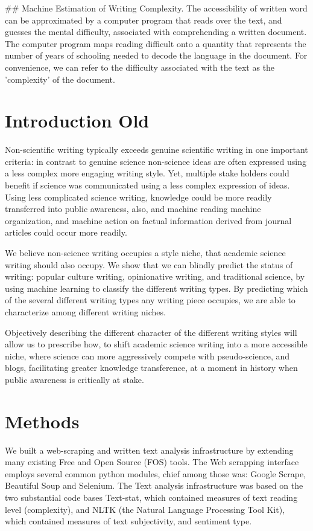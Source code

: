 \documentclass{clv3}
\begin{document}
## Machine Estimation of Writing Complexity.
The accessibility of written word can be approximated by a computer program that reads over the text, and guesses the mental difficulty, associated with comprehending a written document. The computer program maps reading difficult onto a quantity that represents the number of years of schooling needed to decode the language in the document. For convenience, we can refer to the difficulty associated with the text as the 'complexity' of the document. 


\section{Introduction Old}

Non-scientific writing typically exceeds genuine scientific writing in one important criteria: in contrast to genuine science non-science ideas are often expressed using a less complex more engaging writing style.  Yet, multiple stake holders could benefit if science was communicated using a less complex expression of ideas. Using less complicated science writing, knowledge could be more readily transferred into public awareness, also, and machine reading machine organization, and machine action on factual information derived from journal articles could occur more readily.

We believe non-science writing occupies a style niche, that academic science writing should also occupy. We show that we can blindly predict the status of writing: popular culture writing, opinionative writing, and traditional science, by using machine learning to classify the different writing types. By predicting which of the several different writing types any writing piece occupies, we are able to characterize among different writing niches.

Objectively describing the different character of the different writing styles will allow us to prescribe how, to shift academic science writing into a more accessible niche, where science can more aggressively compete with pseudo-science, and blogs, facilitating greater knowledge transference, at a moment in history when public awareness is critically at stake.


\section{Methods}

We built a web-scraping and written text analysis infrastructure by extending many existing Free and Open Source (FOS) tools. The Web scrapping interface employs several common python modules, chief among those was: Google Scrape, Beautiful Soup and Selenium. The Text analysis infrastructure was based on the two substantial code bases Text-stat, which contained measures of text reading level (complexity), and NLTK (the Natural Language Processing Tool Kit), which contained measures of text subjectivity, and sentiment type.
\end{document}
